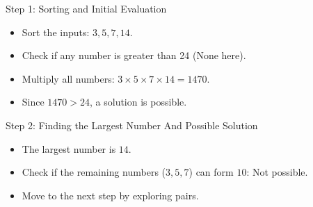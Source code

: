 \documentclass[aspectratio=169, xcolor={dvipsnames}, 10pt, brazil]{beamer}
\begin{document}
\begin{frame}{Step 1: Sorting and Initial Evaluation}
    \begin{itemize}
        \item Sort the inputs: \( 3, 5, 7, 14 \).
        \pause
        \item Check if any number is greater than 24 (None here).
        \pause
        \item Multiply all numbers: \( 3 \times 5 \times 7 \times 14 = 1470 \).
        \pause
        \item Since \( 1470 > 24 \), a solution is possible.
    \end{itemize}
    \vspace{0.5cm}
    
\end{frame}
\begin{frame}{Step 2: Finding the Largest Number And Possible Solution}
    \begin{itemize}
        \item The largest number is \( 14 \).
        \pause
        \item Check if the remaining numbers (\( 3, 5, 7 \)) can form \( 10 \): Not possible.
        \pause
        \item Move to the next step by exploring pairs.
    \end{itemize}
    \vspace{0.5cm}
   
\end{frame}
\end{document}
